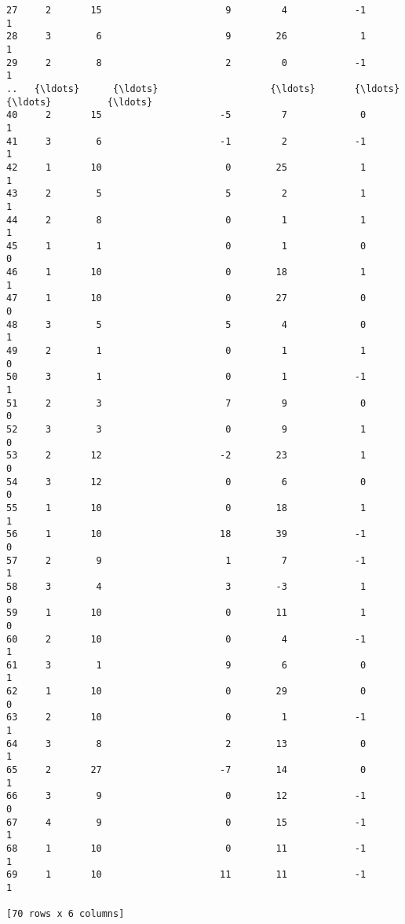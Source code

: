 \documentclass[11pt]{article}
\begin{document}
\begin{Verbatim}[commandchars=\\\{\}]
27     2       15                      9         4            -1            1
28     3        6                      9        26             1            1
29     2        8                      2         0            -1            1
..   {\ldots}      {\ldots}                    {\ldots}       {\ldots}           {\ldots}          {\ldots}
40     2       15                     -5         7             0            1
41     3        6                     -1         2            -1            1
42     1       10                      0        25             1            1
43     2        5                      5         2             1            1
44     2        8                      0         1             1            1
45     1        1                      0         1             0            0
46     1       10                      0        18             1            1
47     1       10                      0        27             0            0
48     3        5                      5         4             0            1
49     2        1                      0         1             1            0
50     3        1                      0         1            -1            1
51     2        3                      7         9             0            0
52     3        3                      0         9             1            0
53     2       12                     -2        23             1            0
54     3       12                      0         6             0            0
55     1       10                      0        18             1            1
56     1       10                     18        39            -1            0
57     2        9                      1         7            -1            1
58     3        4                      3        -3             1            0
59     1       10                      0        11             1            0
60     2       10                      0         4            -1            1
61     3        1                      9         6             0            1
62     1       10                      0        29             0            0
63     2       10                      0         1            -1            1
64     3        8                      2        13             0            1
65     2       27                     -7        14             0            1
66     3        9                      0        12            -1            0
67     4        9                      0        15            -1            1
68     1       10                      0        11            -1            1
69     1       10                     11        11            -1            1

[70 rows x 6 columns]

    \end{Verbatim}
\end{document}
